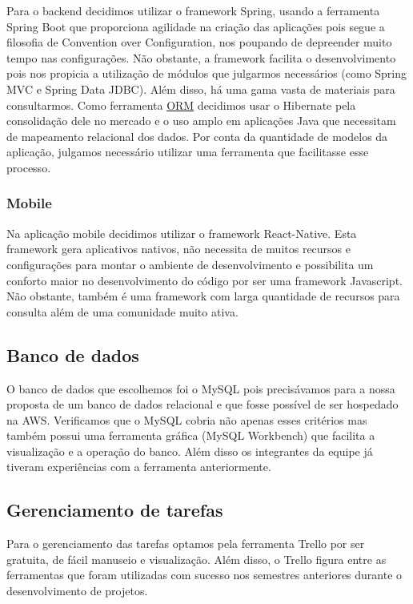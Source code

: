 Para o \gls{backend} decidimos utilizar o \gls{framework} Spring, usando a ferramenta Spring Boot que proporciona agilidade na criação das aplicações pois segue a filosofia de Convention over Configuration\cite{Devopedia2020}, nos poupando de depreender muito tempo nas configurações. Não obstante, a \gls{framework} facilita o desenvolvimento pois nos propicia a utilização de módulos que julgarmos necessários (como Spring MVC e Spring Data JDBC). Além disso, há uma gama vasta de materiais para consultarmos.
Como ferramenta \label{sig:ORM}\hyperlink{s:ORM}{ORM} decidimos usar o Hibernate pela consolidação dele no mercado e o uso amplo em aplicações Java que necessitam de mapeamento relacional dos dados. Por conta da quantidade de modelos da aplicação, julgamos necessário utilizar uma ferramenta que facilitasse esse processo. 

\subsubsection{Mobile}
Na aplicação mobile decidimos utilizar o \gls{framework} React-Native. Esta \gls{framework} gera aplicativos nativos, não necessita de muitos recursos e configurações para montar o ambiente de desenvolvimento e possibilita um conforto maior no desenvolvimento do código por ser uma \gls{framework} Javascript. Não obstante, também é uma \gls{framework} com larga quantidade de recursos para consulta além de uma comunidade muito ativa.

\subsection{Banco de dados}
O banco de dados que escolhemos foi o MySQL pois precisávamos para a nossa proposta de um banco de dados relacional e que fosse possível de ser hospedado na AWS. Verificamos que o MySQL cobria não apenas esses critérios mas também possui uma ferramenta gráfica (MySQL Workbench) que facilita a visualização e a operação do banco. Além disso os integrantes da equipe já tiveram experiências com a ferramenta anteriormente.

\subsection{Gerenciamento de tarefas}
Para o gerenciamento das tarefas optamos pela ferramenta Trello por ser gratuita, de fácil manuseio e visualização.
Além disso, o Trello figura entre as ferramentas que foram utilizadas com sucesso nos semestres anteriores durante o desenvolvimento de projetos.


